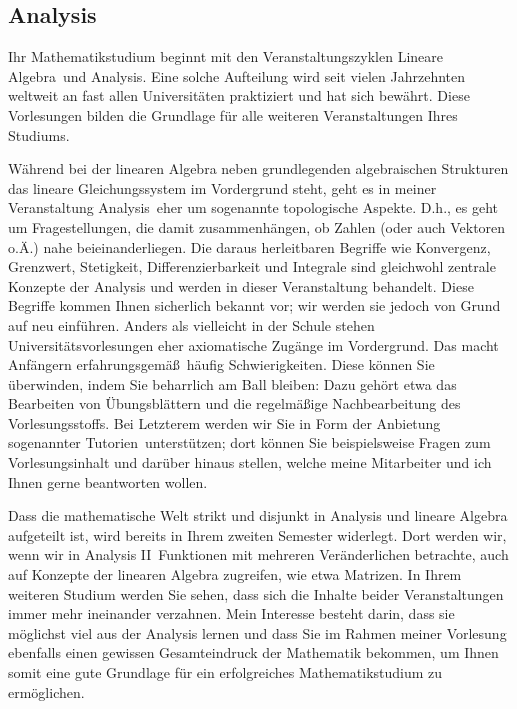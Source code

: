 \subsection{Analysis}

Ihr Mathematikstudium beginnt mit den Veranstaltungszyklen \glqq Lineare
Algebra\grqq\ und \glqq Analysis\grqq. Eine solche Aufteilung wird seit vielen
Jahrzehnten weltweit an fast allen Universit\"aten praktiziert und hat sich
bew\"ahrt. Diese Vorlesungen bilden die Grundlage f\"ur alle weiteren
Veranstaltungen Ihres Studiums.

W\"ahrend bei der linearen Algebra neben grundlegenden algebraischen Strukturen
das lineare Gleichungssystem im Vordergrund steht, geht es in meiner
Veranstaltung \glqq Analysis\grqq\ eher um sogenannte \glqq topologische
Aspekte\grqq. D.h., es geht um Fragestellungen, die damit zusammenh\"angen, ob
Zahlen (oder auch Vektoren o.\"A.) \glqq nahe beieinanderliegen\grqq. Die
daraus herleitbaren Begriffe wie Konvergenz, Grenzwert, Stetigkeit,
Differenzierbarkeit und Integrale sind gleichwohl zentrale Konzepte der
Analysis und werden in dieser Veranstaltung behandelt. Diese Begriffe kommen
Ihnen sicherlich bekannt vor; wir werden sie jedoch von Grund auf neu
einf\"uhren.  Anders als vielleicht in der Schule stehen
Universit\"atsvorlesungen eher axiomatische Zug\"ange im Vordergrund.  Das
macht Anf\"angern erfahrungsgem\"a\ss\ h\"aufig Schwierigkeiten. Diese k\"onnen
Sie \"uberwinden, indem Sie beharrlich \glqq am Ball bleiben\grqq: Dazu
geh\"ort etwa das Bearbeiten von \"Ubungsbl\"attern und die regelm\"a\ss ige
Nachbearbeitung des Vorlesungsstoffs. Bei Letzterem werden wir Sie in Form der
Anbietung sogenannter \glqq Tutorien\grqq\ unterst\"utzen; dort k\"onnen Sie
beispielsweise Fragen zum Vorlesungsinhalt und darüber hinaus stellen, welche
meine Mitarbeiter und ich Ihnen gerne beantworten wollen.

Dass die mathematische Welt strikt und disjunkt in Analysis und lineare Algebra
aufgeteilt ist, wird bereits in Ihrem zweiten Semester widerlegt. Dort werden
wir, wenn wir in \glqq Analysis II\grqq\ Funktionen mit mehreren
Ver\"anderlichen betrachte, auch auf Konzepte der linearen Algebra zugreifen,
wie etwa Matrizen.  In Ihrem weiteren Studium werden Sie sehen, dass sich die
Inhalte beider Veranstaltungen immer mehr ineinander verzahnen. Mein Interesse
besteht darin, dass sie m\"oglichst viel aus der Analysis lernen und dass Sie
im Rahmen meiner Vorlesung ebenfalls einen gewissen Gesamteindruck der
Mathematik bekommen, um Ihnen somit eine gute Grundlage f\"ur ein erfolgreiches
Mathematikstudium zu erm\"oglichen.

